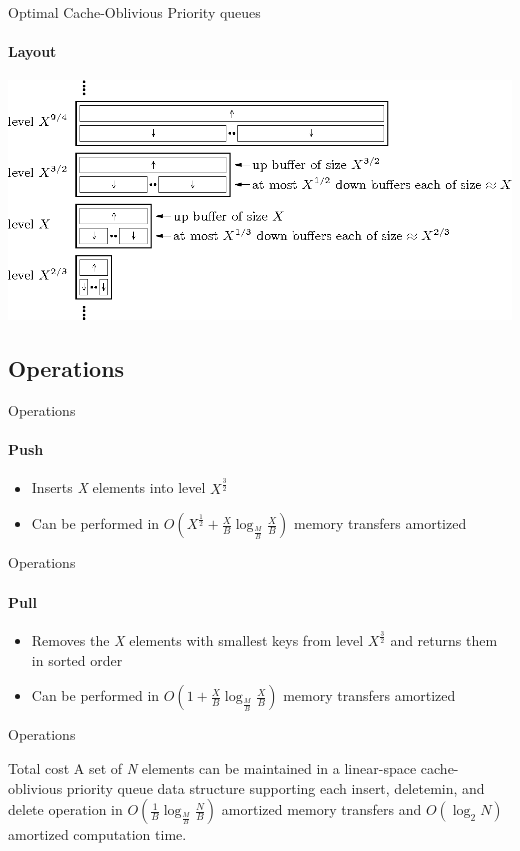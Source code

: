 \documentclass{beamer}
\begin{document}
\begin{darkframes}
    \begin{frame}{Optimal Cache-Oblivious Priority queues}
    \framesubtitle{Layout}
         \includegraphics[width=\textwidth]{resources/queue}
    \end{frame}
    
    \subsection{Operations}

    \begin{frame}{Operations}
    \framesubtitle{Push}
    \begin{itemize}
    \item Inserts \textit{X} elements into level \(X^\frac{3}{2}\)
    \item Can be performed in \(O(X^\frac{1}{2} + \frac{X}{B}\log_\frac{M}{B} \frac{X}{B})\) memory transfers amortized
    \end{itemize}
    \end{frame}

    \begin{frame}{Operations}
    \framesubtitle{Pull}
    \begin{itemize}
    \item Removes the \textit{X} elements with smallest keys from level \(X^\frac{3}{2}\) and returns them in sorted order
    \item Can be performed in \(O(1 + \frac{X}{B}\log_\frac{M}{B} \frac{X}{B})\) memory transfers amortized
    \end{itemize}
    \end{frame}

    \begin{frame}{Operations}
    \begin{block}{Total cost}
    A set of \textit{N} elements can be maintained in a linear-space cache-oblivious priority queue data structure supporting each insert, deletemin, and delete operation in \(O(\frac{1}{B}\log_\frac{M}{B} \frac{N}{B})\) amortized memory transfers and \(O(\log_2 N)\) amortized computation time.
    \end{block}
    \end{frame}
    

\end{darkframes}
\end{document}
